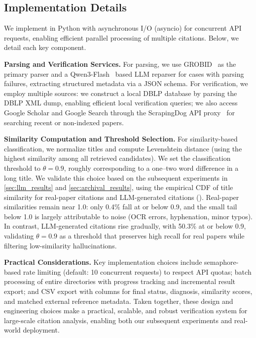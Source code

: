 \subsection{Implementation Details}
We implement \citeb in Python with asynchronous I/O (asyncio) for concurrent API requests, enabling efficient parallel processing of multiple citations.
Below, we detail each key component.

\noindent\textbf{Parsing and Verification Services.}
For parsing, we use GROBID~\cite{grobid-client-python} as the primary parser and a Qwen3-Flash~\cite{bai2023qwen} based LLM reparser for cases with parsing failures, extracting structured metadata via a JSON schema.
For verification, we employ multiple sources: we construct a local DBLP database by parsing the DBLP XML dump, enabling efficient local verification queries; we also access Google Scholar and Google Search through the ScrapingDog API proxy~\cite{scrapingdog} for searching recent or non-indexed papers.

\noindent\textbf{Similarity Computation and Threshold Selection.}
For similarity-based classification, we normalize titles and compute Levenshtein distance\cite{levenshtein1966binary} (using the highest similarity among all retrieved candidates).
We set the classification threshold to $\theta = 0.9$, roughly corresponding to a one--two word difference in a long title.
We validate this choice based on the subsequent experiments in \cref{sec:llm_results} and \cref{sec:archival_results}, using the empirical CDF of title similarity for real-paper citations and LLM-generated citations ().
Real-paper similarities remain near 1.0: only 0.4\% fall at or below 0.9, and the small tail below 1.0 is largely attributable to noise (OCR errors, hyphenation, minor typos).
In contrast, LLM-generated citations rise gradually, with 50.3\% at or below 0.9, validating $\theta = 0.9$ as a threshold that preserves high recall for real papers while filtering low-similarity hallucinations.


\noindent\textbf{Practical Considerations.}
Key implementation choices include semaphore-based rate limiting (default: 10 concurrent requests) to respect API quotas; batch processing of entire directories with progress tracking and incremental result export; and CSV export with columns for final status, diagnosis, similarity scores, and matched external reference metadata.
Taken together, these design and engineering choices make \citeb a practical, scalable, and robust verification system for large-scale citation analysis, enabling both our subsequent experiments and real-world deployment.



